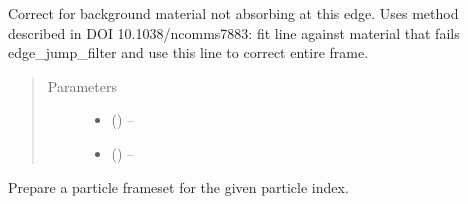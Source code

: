 \documentclass[letterpaper,10pt,english]{sphinxmanual}
\begin{document}
\begin{fulllineitems}

\begin{fulllineitems}
\label{\detokenize{xanespy:xanespy.xanes_frameset.XanesFrameset.normalize}}
Correct for background material not absorbing at this edge. Uses
method described in DOI 10.1038/ncomms7883: fit line against
material that fails edge\_jump\_filter and use this line to
correct entire frame.
\begin{quote}\begin{description}
\item[{Parameters}] \leavevmode\begin{itemize}
\item {} 
 (\sphinxstyleliteralemphasis{-}) -- 

\item {} 
 () -- 

\end{itemize}

\end{description}\end{quote}

\end{fulllineitems}


\begin{fulllineitems}
\label{\detokenize{xanespy:xanespy.xanes_frameset.XanesFrameset.num_energies}}
\end{fulllineitems}


\begin{fulllineitems}
\label{\detokenize{xanespy:xanespy.xanes_frameset.XanesFrameset.num_timesteps}}
\end{fulllineitems}


\begin{fulllineitems}
\label{\detokenize{xanespy:xanespy.xanes_frameset.XanesFrameset.particle}}
Prepare a particle frameset for the given particle index.


\end{fulllineitems}
\end{fulllineitems}
\end{document}
